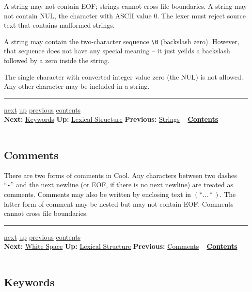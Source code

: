 \documentclass[]{article}
\begin{document}
A string may not contain EOF; strings cannot cross file boundaries. A
string may not contain NUL, the character with ASCII value 0. The lexer
must reject source text that contains malformed strings.

A string may contain the two-character sequence
\texttt{\textbackslash{}0} (backslash zero). However, that sequence does
not have any special meaning -- it just yeilds a backslash followed by a
zero inside the string.

The single character with converted integer value zero (the NUL) is not
allowed. Any other character may be included in a string.

\begin{center}\rule{3in}{0.4pt}\end{center}

\href{node37.html}{next} \href{node33.html}{up}
\href{node35.html}{previous} \href{node1.html}{contents} \\
\textbf{Next:} \href{node37.html}{Keywords} \textbf{Up:}
\href{node33.html}{Lexical Structure} \textbf{Previous:}
\href{node35.html}{Strings} ~ \textbf{\href{node1.html}{Contents}} \\ \\

\subsection{Comments}

There are two forms of comments in Cool. Any characters between two
dashes ``\texttt{-}'' and the next newline (or EOF, if there is no next
newline) are treated as comments. Comments may also be written by
enclosing text in $(\ast \ldots \ast )$. The latter form of comment may
be nested but may not contain EOF. Comments cannot cross file
boundaries.

\begin{center}\rule{3in}{0.4pt}\end{center}

\href{node38.html}{next} \href{node33.html}{up}
\href{node36.html}{previous} \href{node1.html}{contents} \\
\textbf{Next:} \href{node38.html}{White Space} \textbf{Up:}
\href{node33.html}{Lexical Structure} \textbf{Previous:}
\href{node36.html}{Comments} ~ \textbf{\href{node1.html}{Contents}} \\
\\

\subsection{Keywords}
\end{document}
